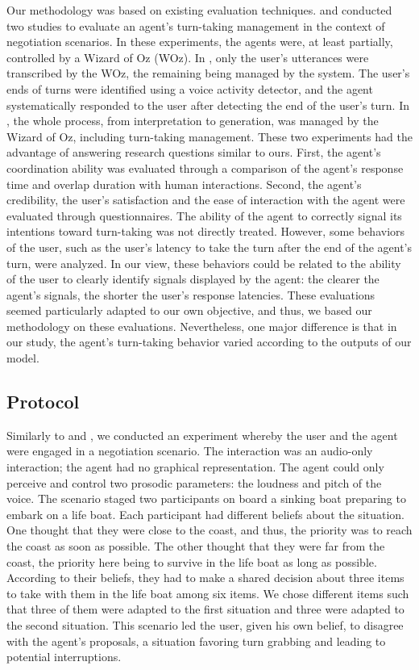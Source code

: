 \documentclass[twocolumn]{svjour3}
\begin{document}
Our methodology was based on existing evaluation techniques.
\cite{skantze_towards_2010} and \cite{de_vault_toward_2015} conducted two studies to evaluate  an agent's turn-taking management in the context of negotiation scenarios. In these experiments, the agents were, at least partially, controlled by a Wizard of Oz (WOz). In \cite{skantze_towards_2010}, only the user's utterances were transcribed by the WOz, the remaining being managed by the system. The user's ends of turns were identified using a voice activity detector, and the agent systematically responded to the user after detecting the end of the user's turn. In \cite{de_vault_toward_2015}, the whole process, from interpretation to generation, was managed by the Wizard of Oz, including turn-taking management. These two experiments had the advantage of answering research questions similar to ours. First, the agent's coordination ability was evaluated through a comparison of the agent's response time and overlap duration with human interactions. Second, the agent's credibility, the user's satisfaction and the ease of interaction with the agent were evaluated through questionnaires. The ability of the agent to correctly signal its intentions toward turn-taking was not directly treated. However, some behaviors of the user, such as the user's latency to take the turn after the end of the agent's turn, were analyzed. In our view, these behaviors could be related to the ability of the user to clearly identify signals displayed by the agent: the clearer the agent's signals, the shorter the user's response latencies. These evaluations seemed particularly adapted to our own objective, and thus, we based our methodology on these evaluations. Nevertheless, one major difference is that in our study, the agent's turn-taking behavior varied according to the outputs of our model. 

\subsection{Protocol}

Similarly to \cite{de_vault_toward_2015} and \cite{skantze_towards_2010}, we conducted an experiment whereby the user and the agent were engaged in a negotiation scenario. The interaction was an audio-only interaction; the agent had no graphical representation. The agent could only perceive and control two prosodic parameters: the loudness and pitch of the voice. 
The scenario staged two participants on board a sinking boat preparing to embark on a life boat. 
Each participant had different beliefs about the situation. 
One thought that they were close to the coast, and thus, the priority was to reach the coast as soon as possible. 
The other thought that they were far from the coast, the priority here being to survive in the life boat as long as possible. 
According to their beliefs, they had to make a shared decision about three items to take with them in the life boat among six items. We chose different items such that three of them were adapted to the first situation and three were adapted to the second situation.
This scenario led the user, given his own belief, to disagree with the agent's proposals, a situation favoring turn grabbing and leading to potential interruptions.   
\end{document}
